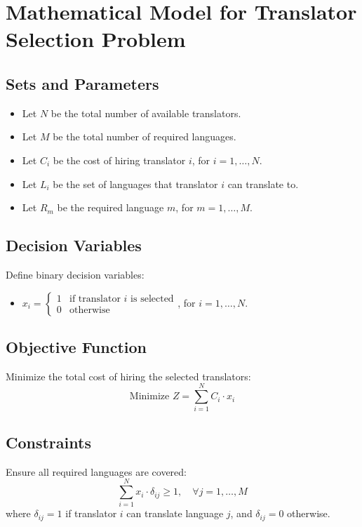 \documentclass{article}
\begin{document}
\section*{Mathematical Model for Translator Selection Problem}

\subsection*{Sets and Parameters}
\begin{itemize}
    \item Let $N$ be the total number of available translators.
    \item Let $M$ be the total number of required languages.
    \item Let $C_i$ be the cost of hiring translator $i$, for $i = 1, \ldots, N$.
    \item Let $L_i$ be the set of languages that translator $i$ can translate to.
    \item Let $R_m$ be the required language $m$, for $m = 1, \ldots, M$.
\end{itemize}

\subsection*{Decision Variables}
Define binary decision variables:
\begin{itemize}
    \item $x_i = \begin{cases} 
    1 & \text{if translator } i \text{ is selected} \\
    0 & \text{otherwise}
    \end{cases}$, for $i = 1, \ldots, N$.
\end{itemize}

\subsection*{Objective Function}
Minimize the total cost of hiring the selected translators:
\[
\text{Minimize } Z = \sum_{i=1}^{N} C_i \cdot x_i
\]

\subsection*{Constraints}
Ensure all required languages are covered:
\[
\sum_{i=1}^{N} x_i \cdot \delta_{ij} \geq 1, \quad \forall j = 1, \ldots, M
\]
where $\delta_{ij} = 1$ if translator $i$ can translate language $j$, and $\delta_{ij} = 0$ otherwise.
\end{document}
